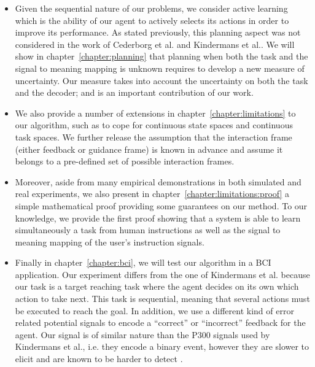 \begin{itemize}
\item Given the sequential nature of our problems, we consider active learning which is the ability of our agent to actively selects its actions in order to improve its performance. As stated previously, this planning aspect was not considered in the work of Cederborg et al. and Kindermans et al.. We will show in chapter~\ref{chapter:planning} that planning when both the task and the signal to meaning mapping is unknown requires to develop a new measure of uncertainty. Our measure takes into account the uncertainty on both the task and the decoder; and is an important contribution of our work.

\item We also provide a number of extensions in chapter~\ref{chapter:limitations} to our algorithm, such as to cope for continuous state spaces and continuous task spaces. We further release the assumption that the interaction frame (either feedback or guidance frame) is known in advance and assume it belongs to a pre-defined set of possible interaction frames.

\item Moreover, aside from many empirical demonstrations in both simulated and real experiments, we also present in chapter~\ref{chapter:limitations:proof} a simple mathematical proof providing some guarantees on our method. To our knowledge, we provide the first proof showing that a system is able to learn simultaneously a task from human instructions as well as the signal to meaning mapping of the user's instruction signals.

\item Finally in chapter~\ref{chapter:bci}, we will test our algorithm in a BCI application. Our experiment differs from the one of Kindermans et al. \cite{Kindermans2012a,kindermans2014true} because our task is a target reaching task where the agent decides on its own which action to take next. This task is sequential, meaning that several actions must be executed to reach the goal. In addition, we use a different kind of error related potential signals to encode a ``correct'' or ``incorrect'' feedback for the agent. Our signal is of similar nature than the P300 signals used by Kindermans et al., i.e. they encode a binary event, however they are slower to elicit and are known to be harder to detect \cite{chavarriaga2014errare}.

\end{itemize}

